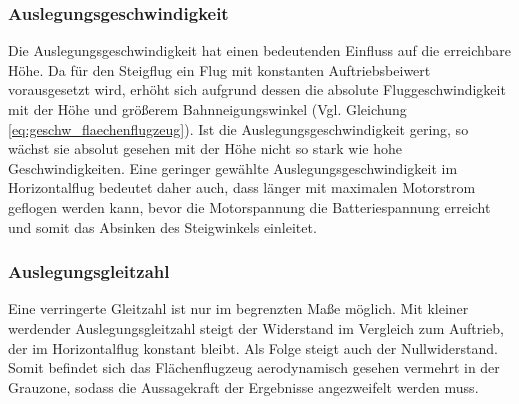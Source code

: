 \subsubsection{Auslegungsgeschwindigkeit}
Die Auslegungsgeschwindigkeit hat einen bedeutenden Einfluss auf die erreichbare Höhe. Da für den Steigflug ein Flug mit konstanten Auftriebsbeiwert vorausgesetzt wird, erhöht sich aufgrund dessen die absolute Fluggeschwindigkeit mit der Höhe und größerem Bahnneigungswinkel (Vgl. Gleichung \ref{eq:geschw_flaechenflugzeug}). Ist die Auslegungsgeschwindigkeit gering, so wächst sie absolut gesehen mit der Höhe nicht so stark wie hohe Geschwindigkeiten. Eine geringer gewählte Auslegungsgeschwindigkeit im Horizontalflug bedeutet daher auch, dass länger mit maximalen Motorstrom geflogen werden kann, bevor die Motorspannung die Batteriespannung erreicht und somit das Absinken des Steigwinkels einleitet.



\subsubsection{Auslegungsgleitzahl}
Eine verringerte Gleitzahl ist nur im begrenzten Maße möglich. Mit kleiner werdender Auslegungsgleitzahl steigt 
der Widerstand im Vergleich zum Auftrieb, der im Horizontalflug konstant bleibt. Als Folge steigt auch der Nullwiderstand. Somit befindet sich das Flächenflugzeug aerodynamisch gesehen vermehrt in der Grauzone, sodass die Aussagekraft der Ergebnisse angezweifelt werden muss. 

